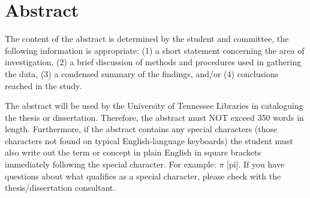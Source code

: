 \chapter*{Abstract} \label{abstract}

The content of the abstract is determined by the student and committee,
the following information is appropriate: (1) a short statement concerning
the area of investigation, (2) a brief discussion of methods and procedures
used in gathering the data, (3) a condensed summary of the findings, and/or
(4) conclusions reached in the study.

The abstract will be used by the University of Tennessee Libraries in cataloguing
the thesis or dissertation. Therefore, the abstract must NOT exceed 350 words
in length. Furthermore, if the abstract contains any special characters
(those characters not found on typical English-language keyboards) the student
must also write out the term or concept in plain English in square brackets
immediately following the special character. For example: $\pi$ [pi].
If you have questions about what qualifies as a special character, please
check with the thesis/dissertation consultant.
